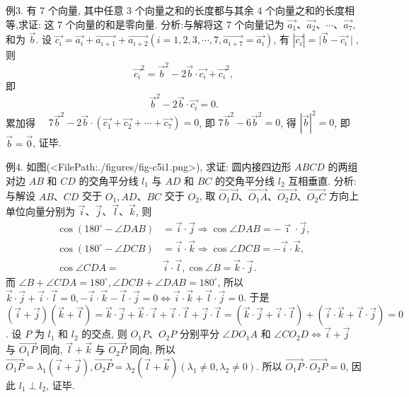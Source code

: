 例3. 有 7 个向量, 其中任意 3 个向量之和的长度都与其余 4 个向量之和的长度相等,求证: 这 7 个向量的和是零向量.
分析:与解将这 7 个向量记为 $\overrightarrow{a_1} 、 \overrightarrow{a_2} 、 \cdots 、 \overrightarrow{a_7}$, 和为 $\vec{b}$.
设 $\overrightarrow{c_i}=\overrightarrow{a_i}+\overrightarrow{a_{i+1}}+\overrightarrow{a_{i+2}}\left(i=1,2,3, \cdots, 7, \overrightarrow{a_{i+7}}=\overrightarrow{a_i}\right)$, 有 $\left|\overrightarrow{c_i}\right|=\mid \vec{b}- \overrightarrow{c_i} \mid$, 则
$$
{\overrightarrow{c_i}}^2=\vec{b}^2-2 \vec{b} \cdot{\overrightarrow{c_i}}+{\overrightarrow{c_i}}^2,
$$
即
$$
\vec{b}^2-2 \vec{b} \cdot \overrightarrow{c_i}=0 .
$$
累加得 $\quad 7 \vec{b}^2-2 \vec{b} \cdot\left(\overrightarrow{c_1}+\overrightarrow{c_2}+\cdots+\overrightarrow{c_7}\right)=0$,
即 $7 \vec{b}^2-6 \vec{b}^2=0$, 得 $|\vec{b}|^2=0$, 即 $\vec{b}=\overrightarrow{0}$, 证毕.



例4. 如图(<FilePath:./figures/fig-c5i1.png>), 求证: 圆内接四边形 $A B C D$ 的两组对边 $A B$ 和 $C D$ 的交角平分线 $l_1$ 与 $A D$ 和 $B C$ 的交角平分线 $l_2$ 互相垂直.
分析:与解设 $A B 、 C D$ 交于 $O_1, A D 、 B C$ 交于 $O_2$, 取 $\overrightarrow{O_1 D} 、 \overrightarrow{O_1 A} 、 \overrightarrow{O_2 D} 、 \overrightarrow{O_2 C}$ 方向上单位向量分别为 $\vec{i} 、 \vec{j} 、 \vec{l} 、 \vec{k}$, 则
$$
\begin{aligned}
\cos \left(180^{\circ}-\angle D A B\right) & =\vec{i} \cdot \vec{j} \Rightarrow \cos \angle D A B=-\vec{\imath} \cdot \vec{j}, \\
\cos \left(180^{\circ}-\angle D C B\right) & =\vec{i} \cdot \vec{k} \Rightarrow \cos \angle D C B=-\vec{i} \cdot \vec{k}, \\
\cos \angle C D A= & \vec{i} \cdot \vec{l}, \cos \angle B=\vec{k} \cdot \vec{j} .
\end{aligned}
$$
而 $\angle B+\angle C D A=180^{\circ}, \angle D C B+\angle D A B=180^{\circ}$,
所以 $\vec{k} \cdot \vec{j}+\vec{i} \cdot \vec{l}=0,-\vec{i} \cdot \vec{k}-\vec{l} \cdot \vec{j}=0 \Leftrightarrow \vec{i} \cdot \vec{k}+\vec{l} \cdot \vec{j}=0$.
于是 $(\vec{i}+\vec{j})(\vec{k}+\vec{l})=\vec{k} \cdot \vec{j}+\vec{k} \cdot \vec{i}+\vec{i} \cdot \vec{l}+\vec{j} \cdot \vec{l}=(\vec{k} \cdot \vec{j}+\vec{i} \cdot \vec{l})+ (\vec{i} \cdot \vec{k}+\vec{l} \cdot \vec{j})=0$.
设 $P$ 为 $l_1$ 和 $l_2$ 的交点, 则 $O_1 P 、 O_2 P$ 分别平分 $\angle D O_1 A$ 和 $\angle C O_2 D \Leftrightarrow \vec{i}+\vec{j}$ 与 $\overrightarrow{O_1 P}$ 同向, $\vec{l}+\vec{k}$ 与 $\overrightarrow{O_2 P}$ 同向, 所以 $\overrightarrow{O_1 P}=\lambda_1(\vec{i}+\vec{j}), \overrightarrow{O_2 P}=\lambda_2(\vec{l}+\vec{k}) \left(\lambda_1 \neq 0, \lambda_2 \neq 0\right)$.
所以 $\overrightarrow{O_1 P} \cdot \overrightarrow{O_2 P}=0$, 因此 $l_1 \perp l_2$, 证毕.



